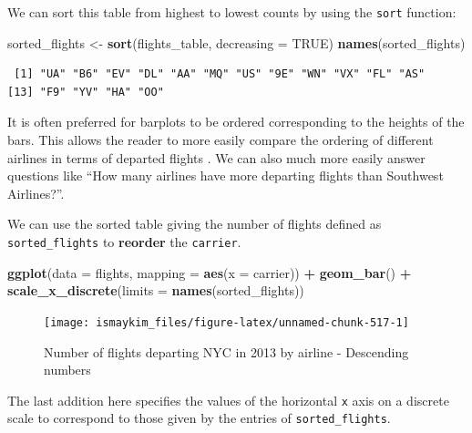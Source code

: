 \documentclass[12pt,]{krantz}
\makeatletter
\newenvironment{Shaded}{\begin{snugshade}}{\end{snugshade}}
\newcommand{\KeywordTok}[1]{\textcolor[rgb]{0.27,0.27,0.27}{\textbf{#1}}}
\newcommand{\DataTypeTok}[1]{\textcolor[rgb]{0.27,0.27,0.27}{#1}}
\newcommand{\StringTok}[1]{\textcolor[rgb]{0.5,0.5,0.5}{#1}}
\newcommand{\OtherTok}[1]{\textcolor[rgb]{0.37,0.37,0.37}{#1}}
\newcommand{\OperatorTok}[1]{\textcolor[rgb]{0.43,0.43,0.43}{\textbf{#1}}}
\newcommand{\NormalTok}[1]{#1}
\newenvironment{kframe}{%
\medskip{}
\setlength{\fboxsep}{.8em}
 \def\at@end@of@kframe{}%
 \ifinner\ifhmode%
  \def\at@end@of@kframe{\end{minipage}}%
  \begin{minipage}{\columnwidth}%
 \fi\fi%
 \def\FrameCommand##1{\hskip\@totalleftmargin \hskip-\fboxsep
 \colorbox{shadecolor}{##1}\hskip-\fboxsep
     \hskip-\linewidth \hskip-\@totalleftmargin \hskip\columnwidth}%
 \MakeFramed {\advance\hsize-\width
   \@totalleftmargin\z@ \linewidth\hsize
   \@setminipage}}%
 {\par\unskip\endMakeFramed%
 \at@end@of@kframe}
\renewenvironment{Shaded}{\begin{kframe}}{\end{kframe}}
\makeatother
\begin{document}
We can sort this table from highest to lowest counts by using the
\texttt{sort} function:

\begin{Shaded}
\begin{Highlighting}[]
\NormalTok{sorted_flights <-}\StringTok{ }\KeywordTok{sort}\NormalTok{(flights_table, }\DataTypeTok{decreasing =} \OtherTok{TRUE}\NormalTok{)}
\KeywordTok{names}\NormalTok{(sorted_flights)}
\end{Highlighting}
\end{Shaded}

\begin{verbatim}
 [1] "UA" "B6" "EV" "DL" "AA" "MQ" "US" "9E" "WN" "VX" "FL" "AS"
[13] "F9" "YV" "HA" "OO"
\end{verbatim}

It is often preferred for barplots to be ordered corresponding to the
heights of the bars. This allows the reader to more easily compare the
ordering of different airlines in terms of departed flights
\citep{robbins2013}. We can also much more easily answer questions like
``How many airlines have more departing flights than Southwest
Airlines?''.

We can use the sorted table giving the number of flights defined as
\texttt{sorted\_flights} to \textbf{reorder} the \texttt{carrier}.

\begin{Shaded}
\begin{Highlighting}[]
\KeywordTok{ggplot}\NormalTok{(}\DataTypeTok{data =}\NormalTok{ flights, }\DataTypeTok{mapping =} \KeywordTok{aes}\NormalTok{(}\DataTypeTok{x =}\NormalTok{ carrier)) }\OperatorTok{+}
\StringTok{  }\KeywordTok{geom_bar}\NormalTok{() }\OperatorTok{+}
\StringTok{  }\KeywordTok{scale_x_discrete}\NormalTok{(}\DataTypeTok{limits =} \KeywordTok{names}\NormalTok{(sorted_flights))}
\end{Highlighting}
\end{Shaded}

\begin{figure}

{\centering \texttt{[image: ismaykim\_files/figure-latex/unnamed-chunk-517-1]} 

}

\caption{Number of flights departing NYC in 2013 by airline - Descending numbers}\label{fig:unnamed-chunk-517}
\end{figure}

The last addition here specifies the values of the horizontal \texttt{x}
axis on a discrete scale to correspond to those given by the entries of
\texttt{sorted\_flights}.
\end{document}
